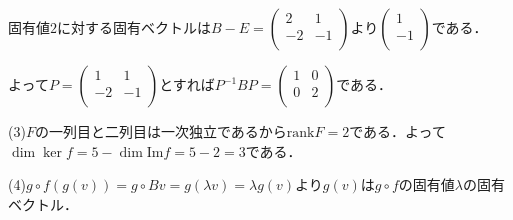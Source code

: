 \documentclass[
		book,
		head_space=20mm,
		foot_space=20mm,
		gutter=10mm,
		line_length=190mm
]{jlreq}
\begin{document}
    固有値$2$に対する固有ベクトルは$B-E=\begin{pmatrix}
        2 & 1 \\
        -2 & -1 \\
        \end{pmatrix}$より$\begin{pmatrix}
            1 \\
            -1 \\
        \end{pmatrix}$である．

        よって$P=\begin{pmatrix}
            1 & 1 \\
            -2 & -1 \\
        \end{pmatrix}$とすれば$P^{-1}BP=\begin{pmatrix}
            1 & 0 \\
            0 & 2 \\
        \end{pmatrix}$である．

    (3)$F$の一列目と二列目は一次独立であるから$\mathrm{rank}F=2$である．よって$\dim \ker f=5-\dim \mathrm{Im}f=5-2=3$である．

    (4)$g \circ f(g(v))=g \circ Bv=g(\lambda v) =\lambda g(v)$より$g(v)$は$g \circ f$の固有値$\lambda$の固有ベクトル．
\end{document}
